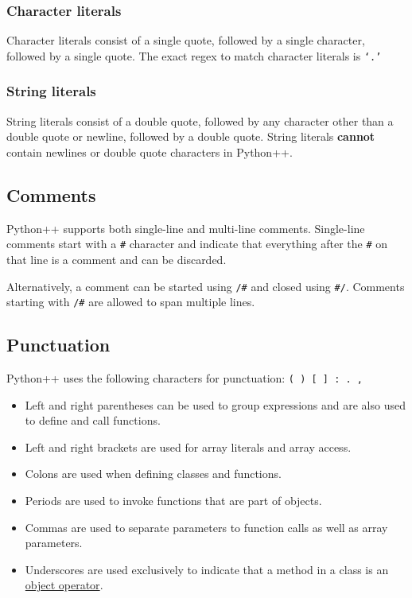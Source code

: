 \documentclass{article}
\begin{document}
\subsubsection{Character literals}
Character literals consist of a single quote, followed by a single character, followed by a single quote. The exact regex to match character literals is \texttt{`.'} 

\subsubsection{String literals}
String literals consist of a double quote, followed by any character other than a double quote or newline, followed by a double quote. String literals \textbf{cannot} contain newlines or double quote characters in Python++.

\subsection{Comments}
Python++ supports both single-line and multi-line comments. Single-line comments start with a \texttt{\#} character and indicate that everything after the \texttt{\#} on that line is a comment and can be discarded.

Alternatively, a comment can be started using \texttt{/\#} and closed using \texttt{\#/}. Comments starting with \texttt{/\#} are allowed to span multiple lines.

\subsection{Punctuation}
Python++ uses the following characters for punctuation: \texttt{( ) [ ] : . , \textunderscore} \newline

\begin{itemize}
\item Left and right parentheses can be used to group expressions and are also used to define and call functions.

\item Left and right brackets are used for array literals and array access.

\item Colons are used when defining classes and functions.

\item Periods are used to invoke functions that are part of objects.

\item Commas are used to separate parameters to function calls as well as array parameters.

\item Underscores are used exclusively to indicate that a method in a class is an \hyperref[sec:object-operators]{object operator}.
\end{itemize}
\end{document}
